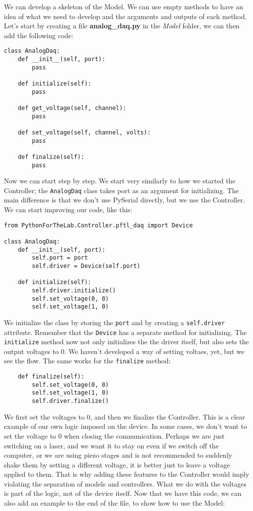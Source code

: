 We can develop a skeleton of the Model. We can use empty methods to have an idea of what we need to develop and the arguments and outputs of each method. Let's start by creating a file \textbf{analog\_daq.py} in the \emph{ Model} folder, we can then add the following code:

\begin{verbatim}
class AnalogDaq:
    def __init__(self, port):
        pass

    def initialize(self):
        pass

    def get_voltage(self, channel):
        pass

    def set_voltage(self, channel, volts):
        pass

    def finalize(self):
        pass
\end{verbatim}

Now we can start step by step. We start very similarly to how we started the Controller; the \texttt{AnalogDaq} class takes port as an argument for initializing. The main difference is that we don't use PySerial directly, but we use the Controller. We can start improving our code, like this:

\begin{verbatim}
from PythonForTheLab.Controller.pftl_daq import Device

class AnalogDaq:
    def __init__(self, port):
        self.port = port
        self.driver = Device(self.port)

    def initialize(self):
        self.driver.initialize()
        self.set_voltage(0, 0)
        self.set_voltage(1, 0)
\end{verbatim}

We initialize the class by storing the \texttt{port} and by creating a \texttt{self.driver} attribute. Remember that the \texttt{Device} has a separate method for initializing. The \texttt{initialize} method now not only initializes the the driver itself, but also sets the output voltages to 0. We haven't developed a way of setting voltaes, yet, but we see the flow. The same works for the \texttt{finalize} method:

\begin{verbatim}
    def finalize(self):
        self.set_voltage(0, 0)
        self.set_voltage(1, 0)
        self.driver.finalize()
\end{verbatim}

We first set the voltages to $0$, and then we finalize the Controller. This is a clear example of our own logic imposed on the device. In some cases, we don't want to set the voltage to 0 when closing the communication. Perhaps we are just switching on a laser, and we want it to stay on even if we switch off the computer, or we are using piezo stages and is not recommended to suddenly shake them by setting a different voltage, it is better just to leave a voltage applied to them. That is why adding these features to the Controller would imply violating the separation of models and controllers. What we do with the voltages is part of the logic, not of the device itself. Now that we have this code, we can also add an example to the end of the file, to show how to use the Model:

